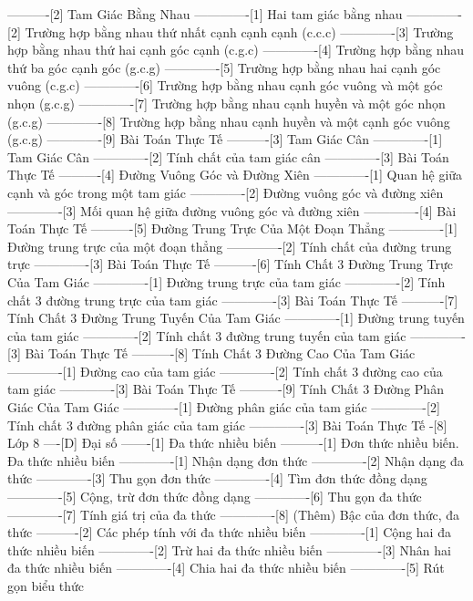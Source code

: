 ----------[2] Tam Giác Bằng Nhau
-------------[1] Hai tam giác bằng nhau
-------------[2] Trường hợp bằng nhau thứ nhất cạnh cạnh cạnh (c.c.c)
-------------[3] Trường hợp bằng nhau thứ hai cạnh góc cạnh (c.g.c)
-------------[4] Trường hợp bằng nhau thứ ba góc cạnh góc (g.c.g)
-------------[5] Trường hợp bằng nhau hai cạnh góc vuông (c.g.c)
-------------[6] Trường hợp bằng nhau cạnh góc vuông và một góc nhọn (g.c.g)
-------------[7] Trường hợp bằng nhau cạnh huyền và một góc nhọn (g.c.g)
-------------[8] Trường hợp bằng nhau cạnh huyền và một cạnh góc vuông (g.c.g)
-------------[9] Bài Toán Thực Tế
----------[3] Tam Giác Cân
-------------[1] Tam Giác Cân
-------------[2] Tính chất của tam giác cân
-------------[3] Bài Toán Thực Tế
----------[4] Đường Vuông Góc và Đường Xiên
-------------[1] Quan hệ giữa cạnh và góc trong một tam giác
-------------[2] Đường vuông góc và đường xiên
-------------[3] Mối quan hệ giữa đường vuông góc và đường xiên
-------------[4] Bài Toán Thực Tế
----------[5] Đường Trung Trực Của Một Đoạn Thẳng
-------------[1] Đường trung trực của một đoạn thẳng
-------------[2] Tính chất của đường trung trực
-------------[3] Bài Toán Thực Tế
----------[6] Tính Chất 3 Đường Trung Trực Của Tam Giác
-------------[1] Đường trung trực của tam giác
-------------[2] Tính chất 3 đường trung trực của tam giác
-------------[3] Bài Toán Thực Tế
----------[7] Tính Chất 3 Đường Trung Tuyến Của Tam Giác
-------------[1] Đường trung tuyến của tam giác
-------------[2] Tính chất 3 đường trung tuyến của tam giác
-------------[3] Bài Toán Thực Tế
----------[8] Tính Chất 3 Đường Cao Của Tam Giác
-------------[1] Đường cao của tam giác
-------------[2] Tính chất 3 đường cao của tam giác
-------------[3] Bài Toán Thực Tế
----------[9] Tính Chất 3 Đường Phân Giác Của Tam Giác
-------------[1] Đường phân giác của tam giác
-------------[2] Tính chất 3 đường phân giác của tam giác
-------------[3] Bài Toán Thực Tế
-[8] Lớp 8
----[D] Đại số
-------[1] Đa thức nhiều biến
----------[1] Đơn thức nhiều biến. Đa thức nhiều biến
-------------[1] Nhận dạng đơn thức
-------------[2] Nhận dạng đa thức
-------------[3] Thu gọn đơn thức
-------------[4] Tìm đơn thức đồng dạng
-------------[5] Cộng, trừ đơn thức đồng dạng
-------------[6] Thu gọn đa thức
-------------[7] Tính giá trị của đa thức
-------------[8] (Thêm) Bậc của đơn thức, đa thức
----------[2] Các phép tính với đa thức nhiều biến
-------------[1] Cộng hai đa thức nhiều biến
-------------[2] Trừ hai đa thức nhiều biến
-------------[3] Nhân hai đa thức nhiều biến
-------------[4] Chia hai đa thức nhiều biến
-------------[5] Rút gọn biểu thức
